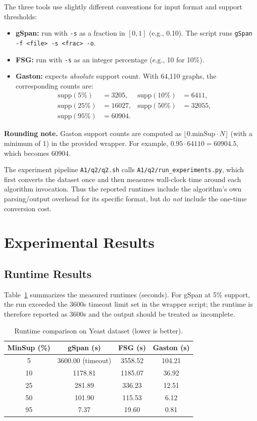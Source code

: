 \documentclass[11pt]{article}
\begin{document}
The three tools use slightly different conventions for input format and support thresholds:
\begin{itemize}
	\item \textbf{gSpan:} run with \texttt{-s} as a fraction in $[0,1]$ (e.g., 0.10). The script runs \texttt{gSpan -f <file> -s <frac> -o}.
	\item \textbf{FSG:} run with \texttt{-s} as an integer percentage (e.g., 10 for 10\%).
	\item \textbf{Gaston:} expects \emph{absolute} support count. With 64,110 graphs, the corresponding counts are:
	\begin{align*}
	\text{supp}(5\%)&=3205, &\text{supp}(10\%)&=6411,\\
	\text{supp}(25\%)&=16027, &\text{supp}(50\%)&=32055,\\
	\text{supp}(95\%)&=60904.
	\end{align*}
\end{itemize}

\noindent\textbf{Rounding note.} Gaston support counts are computed as $\lfloor 0.\text{minSup}\cdot N\rfloor$ (with a minimum of 1) in the provided wrapper. For example, $0.95\cdot 64110=60904.5$, which becomes 60904.

\noindent The experiment pipeline \texttt{A1/q2/q2.sh} calls \texttt{A1/q2/run\_experiments.py}, which first converts the dataset once and then measures wall-clock time around each algorithm invocation. Thus the reported runtimes include the algorithm's own parsing/output overhead for its specific format, but do \emph{not} include the one-time conversion cost.

\section{Experimental Results}

\subsection{Runtime Results}

Table~\ref{tab:q2_runtimes} summarizes the measured runtimes (seconds). For gSpan at 5\% support, the run exceeded the 3600s timeout limit set in the wrapper script; the runtime is therefore reported as 3600s and the output should be treated as incomplete.

\begin{table}[H]
\centering
\begin{tabular}{|c|c|c|c|}
\hline
\textbf{MinSup (\%)} & \textbf{gSpan (s)} & \textbf{FSG (s)} & \textbf{Gaston (s)} \\
\hline
5  & 3600.00 (timeout) & 3558.52 & 104.21 \\
\hline
10 & 1178.81 & 1185.07 & 36.92 \\
\hline
25 & 281.89  & 336.23  & 12.51 \\
\hline
50 & 101.90  & 115.53  & 6.12 \\
\hline
95 & 7.37    & 19.60   & 0.81 \\
\hline
\end{tabular}
\caption{Runtime comparison on Yeast dataset (lower is better).}
\label{tab:q2_runtimes}
\end{table}
\end{document}
